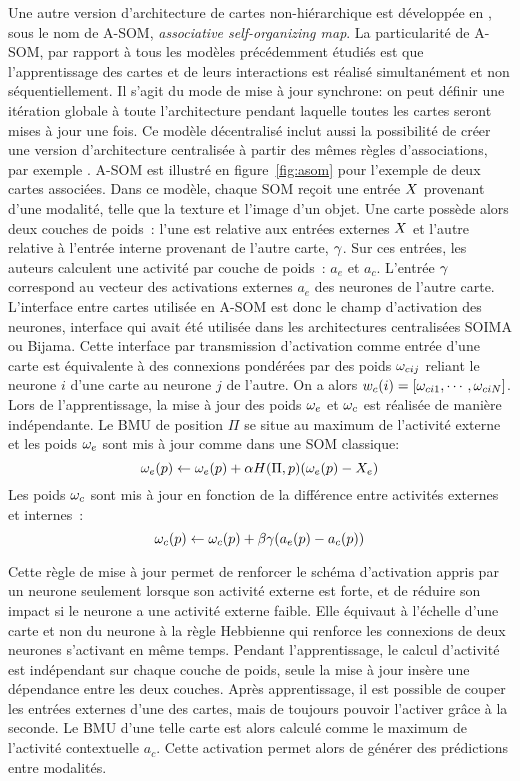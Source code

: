 \documentclass[../main]{subfiles}
\begin{document}
Une autre version d'architecture de cartes non-hiérarchique est développée en \cite{johnsson_associating_2008,johnsson_associative_2009}, sous le nom de A-SOM, \emph{associative self-organizing map}. 
La particularité de A-SOM, par rapport à tous les modèles précédemment étudiés est que l'apprentissage des cartes et de leurs interactions est réalisé simultanément et non séquentiellement. Il s'agit du mode de mise à jour synchrone: on peut définir une itération globale à toute l'architecture pendant laquelle toutes les cartes seront mises à jour une fois.
Ce modèle décentralisé inclut aussi la possibilité de créer une version d'architecture centralisée à partir des mêmes règles d'associations, par exemple \cite{buonamente_hierarchies_2016}. A-SOM est illustré en figure~\ref{fig:asom} pour l'exemple de deux cartes associées. 
Dans ce modèle, chaque SOM reçoit une entrée $X$ provenant d'une modalité, telle que la texture et l'image d'un objet.
Une carte possède alors deux couches de poids~: l'une est relative aux entrées externes $X$ et l'autre relative à l'entrée interne provenant de l'autre carte, $\gamma$.
Sur ces entrées, les auteurs calculent une activité par couche de poids~: $a_e$ et $a_c$.
L'entrée $\gamma$ correspond au vecteur des activations externes $a_e$ des neurones de l'autre carte.
L'interface entre cartes utilisée en A-SOM est donc le champ d'activation des neurones, interface qui avait été utilisée dans les architectures centralisées SOIMA ou Bijama. Cette interface par transmission d'activation comme entrée d'une carte est équivalente à des connexions pondérées par des poids $\omega_{cij}$ reliant le neurone $i$ d'une carte au neurone $j$ de l'autre. On a alors $w_c(i) = [\omega_{ci1}, \cdots, \omega_{ciN}]$.
Lors de l'apprentissage, la mise à jour des poids $\omega_e$ et $\omega_c$ est réalisée de manière indépendante. 
Le BMU de position $\Pi$ se situe au maximum de l'activité externe et les poids $\omega_e$ sont mis à jour comme dans une SOM classique:
$$ \omega_e(p) \leftarrow \omega_e(p) + \alpha H(\Pi,p)(\omega_e(p) - X_e )$$
Les poids $\omega_c$ sont mis à jour en fonction de la différence entre activités externes et internes~:
$$ \omega_c(p) \leftarrow \omega_c(p) + \beta \gamma (a_e(p) - a_c(p))$$

Cette règle de mise à jour permet de renforcer le schéma d'activation appris par un neurone seulement lorsque son activité externe est forte, et de réduire son impact si le neurone a une activité externe faible. Elle équivaut à l'échelle d'une carte et non du neurone à la règle Hebbienne qui renforce les connexions de deux neurones s'activant en même temps.
Pendant l'apprentissage, le calcul d'activité est indépendant sur chaque couche de poids, seule la mise à jour insère une dépendance entre les deux couches.
Après apprentissage, il est possible de couper les entrées externes d'une des cartes, mais de toujours pouvoir l'activer grâce à la seconde. Le BMU d'une telle carte est alors calculé comme le maximum de l'activité contextuelle $a_c$. Cette activation permet alors de générer des prédictions entre modalités.
\end{document}
